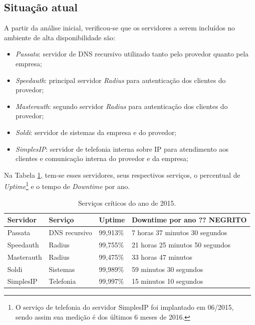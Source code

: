 \subsection{Situação atual}
\label{section:maqservcrit}

A partir da análise inicial, verificou-se que os servidores a serem incluídos no ambiente de alta disponibilidade são:
\begin{itemize}
 \item \textit{Passata}: servidor de \ac{DNS} recursivo utilizado tanto pelo provedor quanto pela empresa;
 \item \textit{Speedauth}: principal servidor \textit{Radius} para autenticação dos clientes do provedor;
 \item \textit{Masterauth}: segundo servidor \textit{Radius} para autenticação dos clientes do provedor;
 \item \textit{Soldi}: servidor de sistemas da empresa e do provedor;
 \item \textit{SimplesIP}: servidor de telefonia interna sobre \ac{IP} para atendimento aos clientes e comunicação interna do provedor e da empresa;
\end{itemize}

Na Tabela \ref{tab:dispservcrit}, tem-se esses servidores, seus respectivos serviços, o percentual de \textit{Uptime}\footnote[1]{O serviço de 
telefonia do servidor SimplesIP foi implantado em 06/2015, sendo assim sua medição é dos últimos 6 meses de 2016.} e o tempo de \textit{Downtime} 
por ano. 

\begin{table}[h!]
\caption{Serviços críticos do ano de 2015.}
\label{tab:dispservcrit}
\begin{center}
\begin{tabular}{|l|l|l|l|}\hline
Servidor & Serviço & Uptime & Downtime por ano ?? NEGRITO \\\hline
Passata & DNS recursivo & 99,913\% & 7 horas 37 minutos 30 segundos \\\hline
Speedauth & Radius & 99,755\% & 21 horas 25 minutos 50 segundos \\\hline
Masterauth & Radius & 99,475\% & 33 horas 47 minutos\\\hline
Soldi & Sistemas & 99,989\% & 59 minutos 30 segundos \\\hline
SimplesIP & Telefonia & 99,997\% & 15 minutos 10 segundos \\\hline %
\end{tabular}
\end{center}
\end{table}

